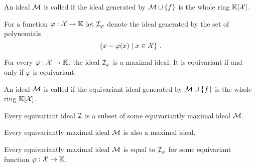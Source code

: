 %
\begin{definition}
    An ideal $\idl[M]$ is called  if the ideal generated by $\idl[M]\cup\set{f}$ is the whole ring $\mathbb{K}[\mathcal{X}]$.
\end{definition}
%
\begin{definition}
    For a function $\varphi : \mathcal{X}\to\mathbb{K}$ let $\idl[I]_{\varphi}$ denote the ideal generated by the set of polynomials
    \[
    \setof{x - \varphi(x)}{x\in\Indets} \ .
    \]
\end{definition}
%
\begin{lemma}
    For every $\varphi : \mathcal{X} \to \mathbb{K}$,
    the ideal $\idl[I]_{\varphi}$ is a maximal ideal.
    It is equivariant if and only if $\varphi$ is equivariant.
\end{lemma}
%
\begin{definition}
    An ideal $\idl[M]$ is called  if the equivariant ideal generated by $\idl[M]\cup\set{f}$ is the whole ring $\mathbb{K}[\mathcal{X}]$.
\end{definition}
%
\begin{lemma}
    Every equivariant ideal $\idl[I]$ is a subset of some equivariantly maximal ideal $\idl[M]$.
\end{lemma}
%
\begin{lemma}
    Every equivariantly maximal ideal $\idl[M]$ is also a maximal ideal.
\end{lemma}
%
\begin{corollary}
    Every equivariantly maximal ideal $\idl[M]$ is equal to $\idl[I]_{\varphi}$ for some equivariant function $\varphi : \mathcal{X}\to\mathbb{K}$.
\end{corollary}
%